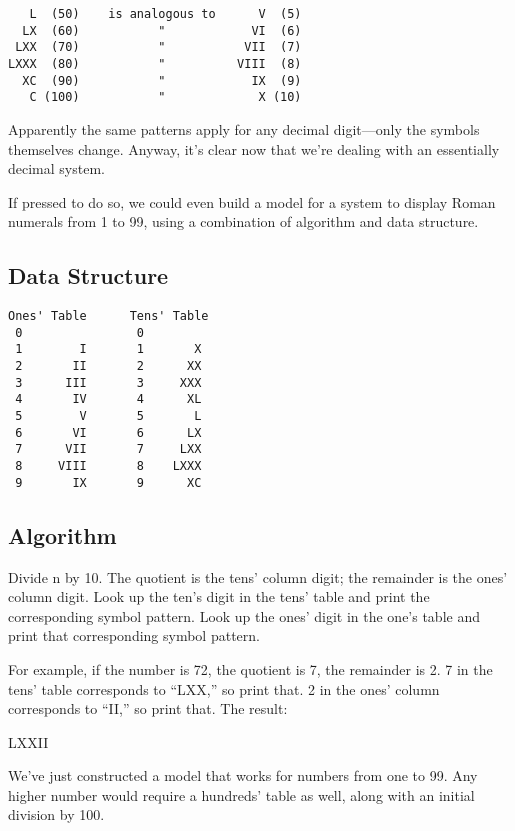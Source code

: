 \begin{verbatim}
   L  (50)    is analogous to      V  (5)
  LX  (60)           "            VI  (6)
 LXX  (70)           "           VII  (7)
LXXX  (80)           "          VIII  (8)
  XC  (90)           "            IX  (9)
   C (100)           "             X (10)
\end{verbatim}

Apparently the same patterns apply for any decimal digit---only the
symbols themselves change. Anyway, it's clear now that we're dealing with
an essentially decimal system.

If pressed to do so, we could even build a model for a system to display
Roman numerals from 1 to 99, using a combination of algorithm and
data structure.

\subsection{Data Structure}

\begin{verbatim}
Ones' Table      Tens' Table
 0                0
 1        I       1       X
 2       II       2      XX
 3      III       3     XXX
 4       IV       4      XL
 5        V       5       L
 6       VI       6      LX
 7      VII       7     LXX
 8     VIII       8    LXXX
 9       IX       9      XC
\end{verbatim}

\subsection{Algorithm}

Divide n by 10. The quotient is the tens' column digit; the remainder is
the ones' column digit. Look up the ten's digit in the tens' table and print
the corresponding symbol pattern. Look up the ones' digit in the one's
table and print that corresponding symbol pattern.

For example, if the number is 72, the quotient is 7, the remainder is
2. 7 in the tens' table corresponds to ``LXX,'' so print that. 2 in the ones'
column corresponds to ``II,'' so print that. The result:

LXXII

We've just constructed a model that works for numbers from one to 99.
Any higher number would require a hundreds' table as well, along with
an initial division by 100.

